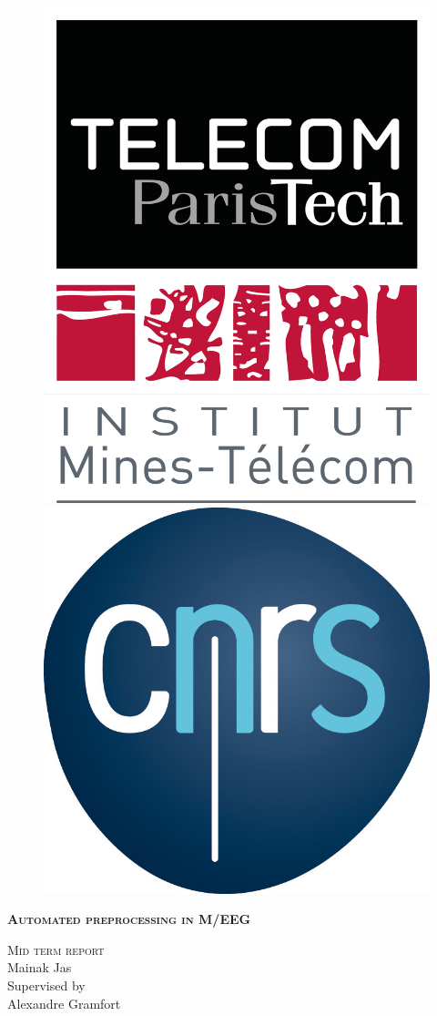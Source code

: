 \documentclass[a4paper,14pt,twoside]{extreport}
\newcommand{\mainak}{\textcolor{magenta}}
\begin{document}
\begin{titlepage}

\begin{figure}
\includegraphics[width=0.2\linewidth]{telecom-logo.png}
\hfill
\includegraphics[width=0.2\linewidth]{CNRS-logo.jpg}
\end{figure}

\centering
\vspace*{2cm}
{\LARGE \scshape \bfseries Automated preprocessing in M/EEG\par}
\vspace{3cm}
{\LARGE \scshape Mid term report \\}
\vspace{2cm}
{\Large Mainak Jas}
\vspace{5cm}
{\\ \large Supervised by \\}
\vspace{0.5cm}
{\large Alexandre Gramfort}
\end{titlepage}



\tableofcontents









%
%



\end{document}
